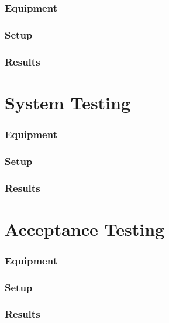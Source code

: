 \subsubsection{Equipment}

\subsubsection{Setup}
 
\subsubsection{Results}
 
\section{System Testing}
 
\subsubsection{Equipment}

\subsubsection{Setup}

\subsubsection{Results}
 
\section{Acceptance Testing}
 
\subsubsection{Equipment}
 
\subsubsection{Setup}
 
\subsubsection{Results}
 





